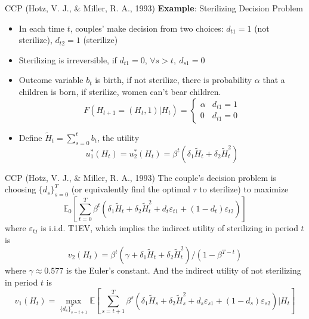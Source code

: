 \documentclass[10pt]{beamer}
\begin{document}
\begin{frame}{CCP (Hotz, V. J., \& Miller, R. A., 1993)}
\textbf{Example}: Sterilizing Decision Problem
\begin{itemize}
	\item In each time $t$, couples' make decision from two choices: $d_{t1} = 1 $ (not sterilize), $d_{t2} = 1 $ (sterilize)
	\item Sterilizing is irreversible, if $d_{t1}=0$, $\forall s>t,\ d_{s1}=0$
	\item Outcome variable $b_t$ is birth, if not sterilize, there is probability $\alpha$ that a children is born, if sterilize, women can't bear children.
	\begin{equation*}
F(H_{t+1}=(H_t,1)|H_{t})=\begin{cases}
	\alpha & d_{t1} = 1 \\
	0 & d_{t1} = 0
\end{cases}	
\end{equation*}
	\item Define $\tilde H_t = \sum_{s=0}^t b_t$, the utility $$u_1^*(H_t) = u_2^*(H_t)=\beta^t(\delta_1 \tilde H_t+\delta_2\tilde H_t^2 )$$ 
\end{itemize}
\end{frame}

\begin{frame}{CCP (Hotz, V. J., \& Miller, R. A., 1993)}
The couple's decision problem is choosing $\{d_s\}_{s=0}^T$ (or equivalently find the optimal $\tau$ to sterilize) to maximize
$$\mathbb{E}_0[\sum_{t=0}^T \beta^t(\delta_1 \tilde H_t+\delta_2\tilde H_t^2+d_t\varepsilon_{t1}+ (1-d_t)\varepsilon_{t2})]$$
where $\varepsilon_{tj}$ is i.i.d. T1EV, which implies the indirect utility of sterilizing in period $t$ is
$$v_2(H_t)=\beta^t(\gamma +\delta_1 \tilde H_t+\delta_2\tilde H_t^2)/(1-\beta^{T-t})$$
where $\gamma \approx 0.577$ is the Euler's constant. And the indirect utility of not sterilizing in period $t$ is
$$v_1(H_t) = \max_{\{d_s\}_{s=t+1}^{T}}\mathbb{E}[\sum_{s=t+1}^{T}\beta^s(\delta_1 \tilde H_s+\delta_2\tilde H_s^2+d_s\varepsilon_{s1}+ (1-d_s)\varepsilon_{s2})|H_t]$$
\end{frame}
\end{document}
